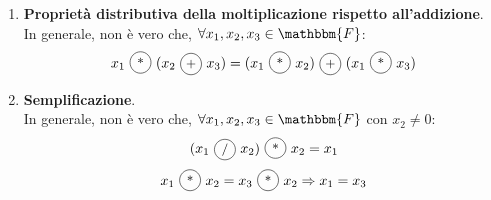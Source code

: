 \documentclass[12pt]{report}
\newcommand{\nmu}{}
\newcommand{\circled}[1]{%
	\begin{tikzpicture}[baseline=(char.base)]
		\node[shape=circle, draw, inner sep=1.2pt, minimum size=1.5em] (char) {\small #1};
	\end{tikzpicture}%
}
\begin{document}
\begin{enumerate}
\begin{example}{\nmu Primo controesempio}{}
		\begin{align*}
			x_2\ \circled{+}\ x_3 &=
			\begin{array}{r@{\quad}l}
				0.13 \cdot 10^{0} & \circled{+} \\
				0.14 \cdot 10^0 &  \\
				\hline
				fl(0.27 \cdot 10^0) &
			\end{array} \\
			&= 0.27 \cdot 10^0 \\
			x_1\ \circled{+}\ (x_2\ \circled{+}\ x_3) &= \begin{array}{r@{\quad}l}
				1.2 \cdot 10^0 & \circled{+} \\
				0.27 \cdot 10^0 &  \\
				\hline
				fl(1.47 \cdot 10^0) &
			\end{array} \\
			&= 1.5 \cdot 10^0
		\end{align*}
	\end{example}
	\begin{example}{\nmu Secondo controesempio}{}
		In doppia precisione, con arrotondamento, consideriamo i numeri di macchina:
		\[
		x_1 = 1 \cdot 2^0 \quad x_2 = 1.0\dots0 \cdot 2^{-53} \quad x_3 = x_2
		\]
		Calcoliamo:
		\begin{align*}
			x_1\ \circled{+}\ x_2 &= arr(1 + 2^{-53}) \\
			&= arr(1.0\dots01) = 1 \cdot 2^0 \\
			(x_1\ \circled{+}\ x_2)\ \circled{+}\ x_3 &= 1 \cdot 2^0 \circled{+} 1 \cdot 2^{-53} \\
			&= 1 \cdot 2^0
		\end{align*}
		D'altra parte:
		\begin{align*}
		x_2\ \circled{+}\ x_3 &= 1 \cdot 2^{-53}\ \circled{+}\ 1 \cdot 2^{-53} \\
		&= 1 \cdot 1 \cdot 2^{-52} \\
		x_1\ \circled{+}\ (x_2\ \circled{+}\ x_3) &= arr(1.0\dots01) \\
		&= 1.0\dots01 \cdot 2^0 \\
		&= 1 + 2^{-52}
		\end{align*}
	\end{example}
	\item \textbf{Proprietà distributiva della moltiplicazione rispetto all'addizione}. \\
	In generale, non è vero che, $\forall x_1, x_2, x_3 \in \mathbbm{F}$:
	\[
	x_1\ \circled{*}\ (x_2\ \circled{+}\ x_3) = (x_1\ \circled{*}\ x_2)\ \circled{+}\ (x_1\ \circled{*}\ x_3)
	\]
	\item \textbf{Semplificazione}. \\
	In generale, non è vero che, $\forall x_1, x_2, x_3 \in \mathbbm{F}$ con $x_2 \neq 0$:
	\[
	(x_1\ \circled{/}\ x_2)\ \circled{*}\ x_2 = x_1
	\]
	\[
	x_1\ \circled{*}\ x_2 = x_3\ \circled{*}\ x_2 \Rightarrow x_1 = x_3
	\]
\end{enumerate}
\end{document}
